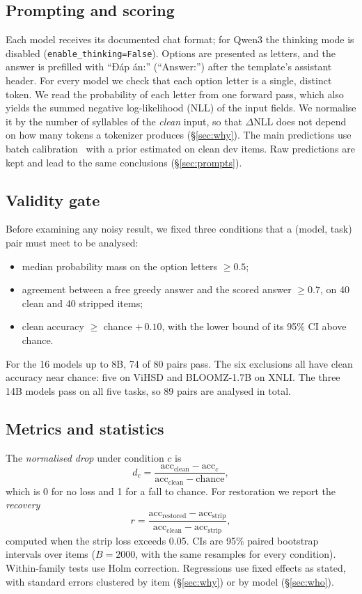 \documentclass[conference]{IEEEtran}
\newcommand{\vi}[1]{{\fontencoding{T5}\selectfont #1}}
\begin{document}
\subsection{Prompting and scoring}
Each model receives its documented chat format; for Qwen3 the thinking mode is disabled (\texttt{enable\_thinking=False}). Options are presented as letters, and the answer is prefilled with \vi{``Đáp án:''} (``Answer:'') after the template's assistant header. For every model we check that each option letter is a single, distinct token. We read the probability of each letter from one forward pass, which also yields the summed negative log-likelihood (NLL) of the input fields. We normalise it by the number of syllables of the \emph{clean} input, so that $\Delta$NLL does not depend on how many tokens a tokenizer produces (\S\ref{sec:why}). The main predictions use batch calibration~\cite{zhou2024batch} with a prior estimated on clean dev items. Raw predictions are kept and lead to the same conclusions (\S\ref{sec:prompts}).

\subsection{Validity gate}
Before examining any noisy result, we fixed three conditions that a (model, task) pair must meet to be analysed:
\begin{itemize}
\item median probability mass on the option letters $\geq 0.5$;
\item agreement between a free greedy answer and the scored answer $\geq 0.7$, on 40 clean and 40 stripped items;
\item clean accuracy $\geq$ chance $+\,0.10$, with the lower bound of its 95\% CI above chance.
\end{itemize}
For the 16 models up to 8B, 74 of 80 pairs pass. The six exclusions all have clean accuracy near chance: five on ViHSD and BLOOMZ-1.7B on XNLI. The three 14B models pass on all five tasks, so 89 pairs are analysed in total.

\subsection{Metrics and statistics}
The \emph{normalised drop} under condition $c$ is
\begin{equation}
d_c = \frac{\mathrm{acc}_{\text{clean}} - \mathrm{acc}_c}{\mathrm{acc}_{\text{clean}} - \text{chance}},
\end{equation}
which is 0 for no loss and 1 for a fall to chance. For restoration we report the \emph{recovery}
\begin{equation}
r = \frac{\mathrm{acc}_{\text{restored}} - \mathrm{acc}_{\text{strip}}}{\mathrm{acc}_{\text{clean}} - \mathrm{acc}_{\text{strip}}},
\end{equation}
computed when the strip loss exceeds 0.05. CIs are 95\% paired bootstrap intervals over items ($B = 2000$, with the same resamples for every condition). Within-family tests use Holm correction. Regressions use fixed effects as stated, with standard errors clustered by item (\S\ref{sec:why}) or by model (\S\ref{sec:who}).
\end{document}

